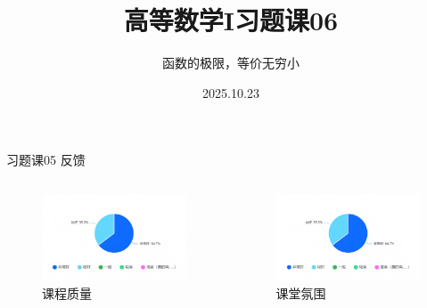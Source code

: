 \documentclass[]{beamer}
\title{高等数学I\quad 习题课06}
\subtitle{函数的极限，等价无穷小}
\date[2025.10.23]{2025.10.23}
\author[上海科技大学]{}
\institute[]{上海科技大学}
\begin{document}
\begin{frame}
    \vspace{15pt}
    \titlepage
\end{frame}


\begin{frame}{习题课05 反馈}
    \begin{columns}
        \begin{column}{0.5\textwidth}
            \begin{figure}[H]
                \centering
                \includegraphics[width=1.0\linewidth]{fb.png}
                \caption{课程质量}
            \end{figure}
        \end{column}

        \begin{column}{0.5\textwidth}
            \begin{figure}[H]
                \centering
                \includegraphics[width=1.0\linewidth]{fb.png}
                \caption{课堂氛围}
            \end{figure}
        \end{column}
    \end{columns}
\end{frame}
\end{document}
